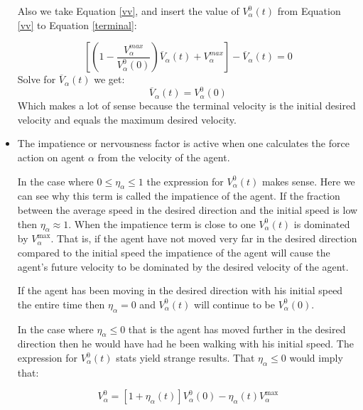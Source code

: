 \begin{itemize}
Also we take Equation \ref{vv}, and insert the value of $ V_{\alpha}^{0}(t) $ from Equation \ref{vv} to Equation \ref{terminal}:

\begin{equation}
	\left[ \left( 1 - \frac{V_{\alpha}^{max}}{V_{\alpha}^{0}(0)}\right)\overline{V}_{\alpha} \left( t \right) + V_{\alpha}^{max} \right] - \overline{V}_{\alpha} \left( t\right) 
    = 0
\end{equation}
Solve for $ \overline{V}_{\alpha} \left( t\right) $ we get:
\begin{equation}
\overline{V}_{\alpha} \left( t\right) = V_{\alpha}^{0}(0)
\end{equation}
Which makes a lot of sense because the terminal velocity is the initial desired velocity and equals the maximum desired velocity.

\item The impatience or nervousness factor is active when one calculates the 
force action on agent $\alpha$ from the velocity of the agent.

In the case where $0 \leq \eta_{\alpha} \leq 1$ the expression for 
$V_{\alpha}^{0} \left( t \right)$  makes sense. Here we can see why this term 
is called the impatience of the agent. If the fraction  between the average 
speed in the desired direction and the initial speed is low then $\eta_{\alpha} \approx 1$. 
When the impatience term is close to one $V_{\alpha}^{0} \left( t \right)$ 
is dominated by $V_{\alpha}^{\text{max}}$. That is, if the agent have not 
moved very far in the desired direction compared to the initial speed the 
impatience of the agent will cause the agent's future velocity to be dominated by 
the desired velocity of the agent.

If the agent has been moving in the desired direction with his initial 
speed the entire time then $\eta_{\alpha} = 0$  and 
$V_{\alpha}^{0} \left( t \right)$ will continue to be $V_{\alpha}^{0} \left( 0 \right)$.

In the case where $\eta_{\alpha} \leq 0$ that is the agent has moved further 
in the desired direction then he would have had he been walking with his 
initial speed. The expression for $V_{\alpha}^{0} \left( t \right)$
stats yield strange results. That $\eta_{\alpha} \leq 0$ would imply that:

\begin{equation}\label{n}
    V_{\alpha}^{0} = \left[ 1 + \eta_{\alpha} \left( t \right) \right] 
    V_{\alpha}^{0} \left( 0 \right) -
    \eta_{\alpha} \left( t \right)V_{\alpha}^{\text{max}}
\end{equation}


\end{itemize}
